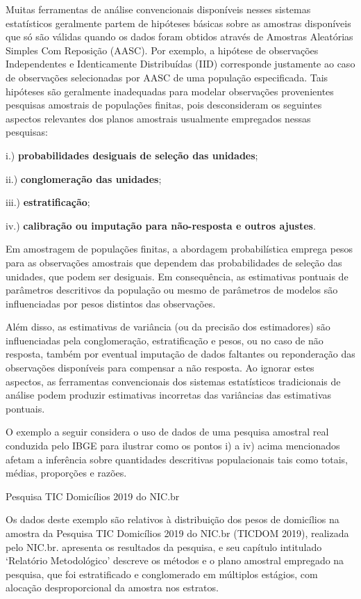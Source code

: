 \documentclass[
]{book}
\begin{document}
Muitas ferramentas de análise convencionais disponíveis nesses sistemas estatísticos geralmente partem de hipóteses básicas sobre as amostras disponíveis que só são válidas quando os dados foram obtidos através de Amostras Aleatórias Simples Com Reposição (AASC). Por exemplo, a hipótese de observações Independentes e Identicamente Distribuídas (IID) corresponde justamente ao caso de observações selecionadas por AASC de uma população especificada. Tais hipóteses são geralmente inadequadas para modelar observações provenientes
pesquisas amostrais de populações finitas, pois desconsideram os seguintes aspectos relevantes dos planos amostrais usualmente empregados nessas pesquisas:

i.) \textbf{probabilidades desiguais de seleção das unidades};

ii.) \textbf{conglomeração das unidades};

iii.) \textbf{estratificação};

iv.) \textbf{calibração ou imputação para não-resposta e outros ajustes}.

Em amostragem de populações finitas, a abordagem probabilística emprega pesos para as observações amostrais que dependem das probabilidades de seleção das unidades, que podem ser desiguais. Em consequência, as estimativas pontuais de parâmetros descritivos da população ou mesmo de parâmetros de modelos são influenciadas por pesos distintos das observações.

Além disso, as estimativas de variância (ou da precisão dos estimadores) são influenciadas pela conglomeração, estratificação e pesos, ou no caso de não resposta, também por eventual imputação de dados faltantes ou reponderação das observações disponíveis para compensar a não resposta. Ao ignorar estes aspectos, as ferramentas convencionais dos sistemas estatísticos tradicionais de análise podem produzir estimativas incorretas das variâncias das estimativas pontuais.

O exemplo a seguir considera o uso de dados de uma pesquisa amostral real
conduzida pelo IBGE para ilustrar como os pontos i) a iv) acima mencionados
afetam a inferência sobre quantidades descritivas populacionais tais como
totais, médias, proporções e razões.

\textbf{\label{exm:ticdom01}} Pesquisa TIC Domicílios 2019 do NIC.br

Os dados deste exemplo são relativos à distribuição dos pesos de domicílios na amostra da Pesquisa TIC Domicílios 2019 do NIC.br (TICDOM 2019), realizada pelo NIC.br. \citep{NICbr2020a} apresenta os resultados da pesquisa, e seu capítulo intitulado `Relatório Metodológico' descreve os métodos e o plano amostral empregado na pesquisa, que foi estratificado e conglomerado em múltiplos estágios, com alocação desproporcional da amostra nos estratos.
\end{document}
